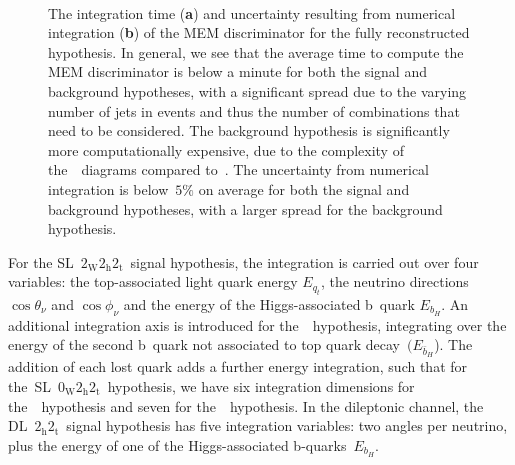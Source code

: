 \begin{figure}
\begin{centering}
\\
\caption[MEM integration time.]{The integration time (\textbf{a}) and uncertainty resulting from numerical integration (\textbf{b}) of the MEM discriminator for the fully reconstructed hypothesis. In general, we see that the average time to compute the MEM discriminator is below a minute for both the signal and background hypotheses, with a significant spread due to the varying number of jets in events and thus the number of combinations that need to be considered. The background hypothesis is significantly more computationally expensive, due to the complexity of the~\ttbb~diagrams compared to~\ttHbb. The uncertainty from numerical integration is below~$5\%$ on average for both the signal and background hypotheses, with a larger spread for the background hypothesis.}
\label{fig:mem_numerical_accuracy}
\end{centering}
\end{figure}

For the SL~$2_{\mathrm{W}} 2_{\mathrm{h}} 2_{\mathrm{t}}$~signal hypothesis, the integration is carried out over four variables: the top-associated light quark energy $E_{q_t}$, the neutrino directions $\cos{\theta_\nu}$ and $\cos{\phi_\nu}$ and the energy of the Higgs-associated b~quark $E_{b_H}$. An additional integration axis is introduced for the~\ttbb~hypothesis, integrating over the energy of the second b~quark not associated to top quark decay~$(E_{\bar{b}_H}$). The addition of each lost quark adds a further energy integration, such that for the~SL~$0_{\mathrm{W}} 2_{\mathrm{h}} 2_{\mathrm{t}}$~hypothesis, we have six integration dimensions for the~\ttHbb~hypothesis and seven for the~\ttbb~hypothesis. In the dileptonic channel, the DL~$2_{\mathrm{h}} 2_{\mathrm{t}}$~signal hypothesis has five integration variables: two angles per neutrino, plus the energy of one of the Higgs-associated b-quarks~$E_{b_H}$.

